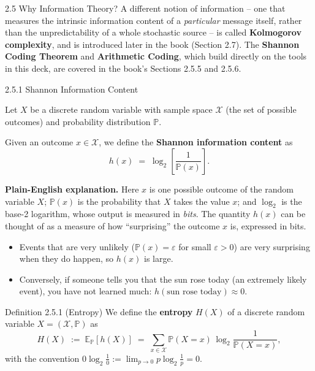 \documentclass[aspectratio=169,10pt]{beamer}
\newcommand{\bbP}{\mathbb{P}}
\newcommand{\bbE}{\mathbb{E}}
\begin{document}
\begin{frame}[allowframebreaks]{2.5 Why Information Theory?}
A different notion of information -- one that measures the intrinsic
information content of a \emph{particular} message itself, rather than the
unpredictability of a whole stochastic source -- is called \textbf{Kolmogorov
complexity}, and is introduced later in the book (Section 2.7). The
\textbf{Shannon Coding Theorem} and \textbf{Arithmetic Coding}, which build
directly on the tools in this deck, are covered in the book's Sections 2.5.5
and 2.5.6.
\end{frame}

\begin{frame}[allowframebreaks]{2.5.1 Shannon Information Content}

Let $X$ be a discrete random variable with sample space $\mathcal{X}$ (the
set of possible outcomes) and probability distribution $\bbP$.

Given an outcome $x \in \mathcal{X}$, we define the \textbf{Shannon
information content} as
\[
  h(x) \;=\; \log_2\!\left[\frac{1}{\bbP(x)}\right].
\]

\textbf{Plain-English explanation.} Here $x$ is one possible outcome of the
random variable $X$; $\bbP(x)$ is the probability that $X$ takes the value
$x$; and $\log_2$ is the base-2 logarithm, whose output is measured in
\emph{bits}. The quantity $h(x)$ can be thought of as a measure of how
``surprising'' the outcome $x$ is, expressed in bits.

\begin{itemize}
  \item Events that are very unlikely ($\bbP(x) = \varepsilon$ for small
    $\varepsilon > 0$) are very surprising when they do happen, so
    $h(x)$ is large.
  \item Conversely, if someone tells you that the sun rose today (an
    extremely likely event), you have not learned much: $h(\text{sun rose
    today}) \approx 0$.
\end{itemize}

\framebreak

\begin{block}{Definition 2.5.1 (Entropy)}
We define the \textbf{entropy} $H(X)$ of a discrete random variable
$X = (\mathcal{X}, \bbP)$ as
\[
  H(X) \;:=\; \bbE_{\bbP}[h(X)] \;=\; \sum_{x \in \mathcal{X}} \bbP(X{=}x)\, \log_2 \frac{1}{\bbP(X{=}x)},
\]
with the convention $0\log_2\tfrac{1}{0} := \lim_{p \to 0} p \log_2 \tfrac{1}{p} = 0$.
\end{block}


\end{frame}
\end{document}
